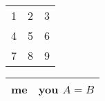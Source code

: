 \documentclass{article}
\begin{document}
\begin{tabular}{ l c r }
  1 & 2 & 3 \\
  4 & 5 & 6 \\
  7 & 8 & 9 \\
\end{tabular}

\begin{tabular}{|r|r|}%
\hline
me & you $A=B$\\ 
\hline
\end{tabular}
\end{document}

